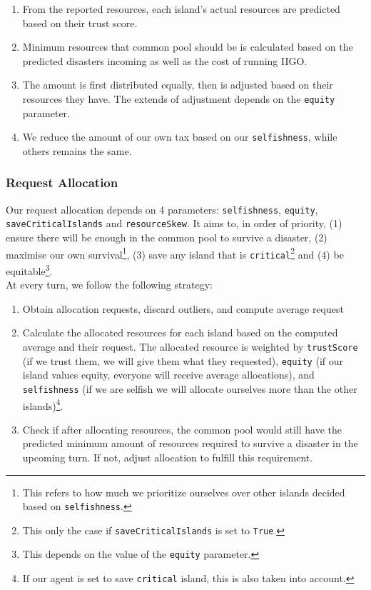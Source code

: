 \begin{enumerate}
    \item From the reported resources, each island's actual resources are predicted based on their trust score.
    \item Minimum resources that common pool should be is calculated based on the predicted disasters incoming as well as the cost of running IIGO.
    \item The amount is first distributed equally, then is adjusted based on their resources they have. The extends of adjustment depends on the \texttt{equity} parameter.
    \item We reduce the amount of our own tax based on our \texttt{selfishness}, while others remains the same.
\end{enumerate}

\subsubsection*{Request Allocation}
Our request allocation depends on 4 parameters: \texttt{selfishness}, \texttt{equity}, \texttt{saveCriticalIslands} and \texttt{resourceSkew}. It aims to, in order of priority, (1) ensure there will be enough in the common pool to survive a disaster, (2) maximise our own survival\footnote{This refers to how much we prioritize ourselves over other islands decided based on \texttt{selfishness}.}, (3) save any island that is \texttt{critical}\footnote{This only the case if \texttt{saveCriticalIslands} is set to \texttt{True}.} and (4) be equitable\footnote{This depends on the value of the \texttt{equity} parameter.}. \\

At every turn, we follow the following strategy:

\begin{enumerate}
    \item Obtain allocation requests, discard outliers, and compute average request
    \item Calculate the allocated resources for each island based on the computed average and their request. The allocated resource is weighted by  \texttt{trustScore} (if we trust them, we will give them what they requested), \texttt{equity} (if our island values equity, everyone will receive average allocations), and \texttt{selfishness} (if we are selfish we will allocate ourselves more than the other islands)\footnote{If our agent is set to save \texttt{critical} island, this is also taken into account.}. 
    \item Check if after allocating resources, the common pool would still have the predicted minimum amount of resources required to survive a disaster in the upcoming turn. If not, adjust allocation to fulfill this requirement. 
\end{enumerate}

